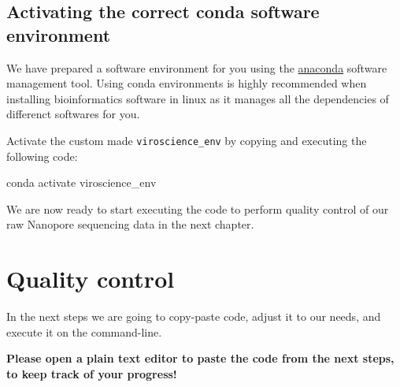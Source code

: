 \documentclass[
  letterpaper,
  DIV=11,
  numbers=noendperiod]{scrreprt}
\newenvironment{Shaded}{\begin{snugshade}}{\end{snugshade}}
\newcommand{\ExtensionTok}[1]{\textcolor[rgb]{0.00,0.23,0.31}{#1}}
\newcommand{\NormalTok}[1]{\textcolor[rgb]{0.00,0.23,0.31}{#1}}
\begin{document}
\section{Activating the correct conda software
environment}\label{activating-the-correct-conda-software-environment}

We have prepared a software environment for you using the
\href{www.anaconda.org}{anaconda} software management tool. Using conda
environments is highly recommended when installing bioinformatics
software in linux as it manages all the dependencies of differenct
softwares for you.

Activate the custom made \texttt{viroscience\_env} by copying and
executing the following code:

\begin{Shaded}
\begin{Highlighting}[]
\ExtensionTok{conda}\NormalTok{ activate viroscience\_env}
\end{Highlighting}
\end{Shaded}

\begin{tcolorbox}[enhanced jigsaw, coltitle=black, colframe=quarto-callout-note-color-frame, leftrule=.75mm, opacityback=0, colbacktitle=quarto-callout-note-color!10!white, left=2mm, bottomtitle=1mm, toptitle=1mm, opacitybacktitle=0.6, rightrule=.15mm, colback=white, toprule=.15mm, breakable, arc=.35mm, bottomrule=.15mm, titlerule=0mm, title=\textcolor{quarto-callout-note-color}{\faInfo}\hspace{0.5em}{Note}]

We are now ready to start executing the code to perform quality control
of our raw Nanopore sequencing data in the next chapter.

\end{tcolorbox}


\chapter{Quality control}\label{quality-control}

\begin{tcolorbox}[enhanced jigsaw, coltitle=black, colframe=quarto-callout-warning-color-frame, leftrule=.75mm, opacityback=0, colbacktitle=quarto-callout-warning-color!10!white, left=2mm, bottomtitle=1mm, toptitle=1mm, opacitybacktitle=0.6, rightrule=.15mm, colback=white, toprule=.15mm, breakable, arc=.35mm, bottomrule=.15mm, titlerule=0mm, title=\textcolor{quarto-callout-warning-color}{\faExclamationTriangle}\hspace{0.5em}{Important!}]

In the next steps we are going to copy-paste code, adjust it to our
needs, and execute it on the command-line.

\textbf{Please open a plain text editor to paste the code from the next
steps, to keep track of your progress!}

\end{tcolorbox}
\end{document}
